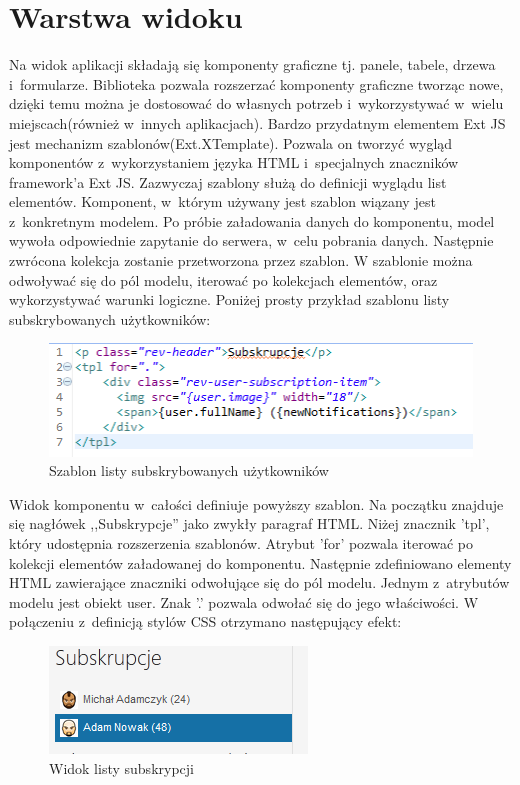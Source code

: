 \section{Warstwa widoku}

Na widok aplikacji składają się komponenty graficzne tj. panele, tabele, drzewa i~formularze. Biblioteka pozwala rozszerzać komponenty graficzne tworząc nowe, dzięki temu można je dostosować do własnych potrzeb i~wykorzystywać w~wielu miejscach(również w~innych aplikacjach). Bardzo przydatnym elementem Ext JS jest mechanizm szablonów(Ext.XTemplate). Pozwala on tworzyć wygląd komponentów z~wykorzystaniem języka HTML i~specjalnych znaczników framework'a Ext JS. Zazwyczaj szablony służą do definicji wyglądu list elementów. Komponent, w~którym używany jest szablon wiązany jest z~konkretnym modelem. Po próbie załadowania danych do komponentu, model wywoła odpowiednie zapytanie do serwera, w~celu pobrania danych. Następnie zwrócona kolekcja zostanie przetworzona przez szablon. W szablonie można odwoływać się do pól modelu, iterować po kolekcjach elementów, oraz wykorzystywać warunki logiczne. Poniżej prosty przykład szablonu listy subskrybowanych użytkowników:
 
\begin{figure}[H]
	\centering
	\includegraphics[width=\textwidth]{images/tpl.png}
	\caption{Szablon listy subskrybowanych użytkowników}
\end{figure}

Widok komponentu w~całości definiuje powyższy szablon. Na początku znajduje się nagłówek ,,Subskrypcje'' jako zwykły paragraf HTML. Niżej znacznik 'tpl', który udostępnia rozszerzenia szablonów. Atrybut 'for' pozwala iterować po kolekcji elementów załadowanej do komponentu. Następnie zdefiniowano elementy HTML zawierające znaczniki odwołujące się do pól modelu. Jednym z~atrybutów modelu jest obiekt user. Znak '.' pozwala odwołać się do jego właściwości. W połączeniu z~definicją stylów CSS otrzymano następujący efekt:
 
\begin{figure}[H]
	\centering
	\includegraphics[width=\textwidth]{images/subs.png}
	\caption{Widok listy subskrypcji}
\end{figure}

